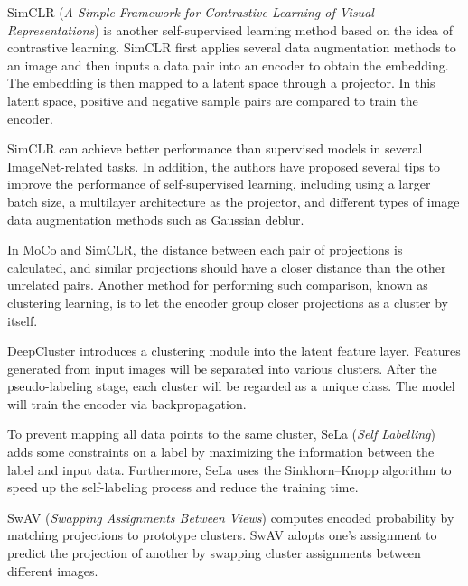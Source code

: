 
SimCLR (\textit{A Simple Framework for Contrastive Learning of Visual Representations}) \cite{SimCLR, chen2020big} is another self-supervised learning method based on the idea of contrastive learning. SimCLR first applies several data augmentation methods to an image and then inputs a data pair into an encoder to obtain the embedding. The embedding is then mapped to a latent space through a projector. In this latent space, positive and negative sample pairs are compared to train the encoder.


SimCLR can achieve better performance than supervised models in several ImageNet-related tasks. In addition, the authors have proposed several tips to improve the performance of self-supervised learning, including using a larger batch size, a multilayer architecture as the projector, and different types of image data augmentation methods such as Gaussian deblur. 

In MoCo and SimCLR, the distance between each pair of projections is calculated, and similar projections should have a closer distance than the other unrelated pairs. Another method for performing such comparison, known as clustering learning, is to let the encoder group closer projections as a cluster by itself.


DeepCluster \cite{DeepClustering} introduces a clustering module into the latent feature layer. Features generated from input images will be separated into various clusters. After the pseudo-labeling stage, each cluster will be regarded as a unique class. The model will train the encoder via backpropagation.


To prevent mapping all data points to the same cluster, SeLa (\textit{Self Labelling}) \cite{SeLa} adds some constraints on a label by maximizing the information between the label and input data. Furthermore, SeLa uses the Sinkhorn–Knopp algorithm to speed up the self-labeling process and reduce the training time.


SwAV (\textit{Swapping Assignments Between Views}) \cite{SwAV} computes encoded probability by matching projections to prototype clusters. SwAV adopts one's assignment to predict the projection of another by swapping cluster assignments between different images. 

